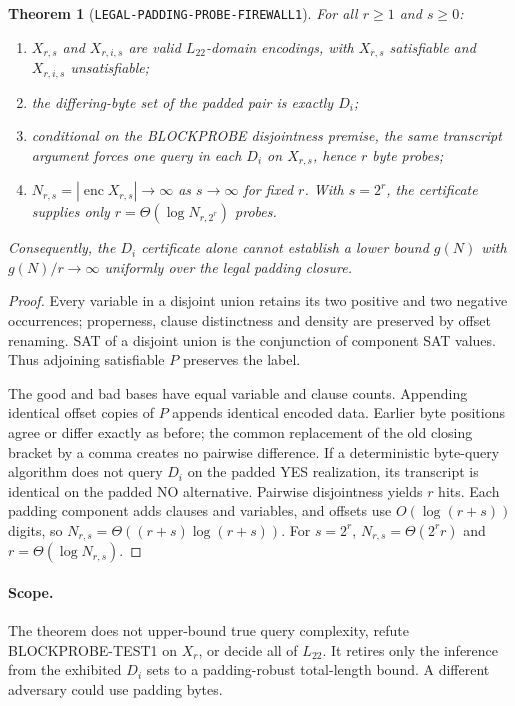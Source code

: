 \documentclass[11pt]{article}
\newtheorem{theorem}{Theorem}
\newcommand{\Ltwo}{L_{22}}
\begin{document}
\begin{theorem}[\texttt{LEGAL-PADDING-PROBE-FIREWALL1}]
For all $r\ge1$ and $s\ge0$:
\begin{enumerate}[label=(\roman*),leftmargin=*]
\item $X_{r,s}$ and $X_{r,i,s}$ are valid \(\Ltwo\)-domain encodings,
with $X_{r,s}$ satisfiable and $X_{r,i,s}$ unsatisfiable;
\item the differing-byte set of the padded pair is exactly $D_i$;
\item conditional on the BLOCKPROBE disjointness premise, the same transcript
argument forces one query in each $D_i$ on $X_{r,s}$, hence $r$ byte probes;
\item $N_{r,s}=|\operatorname{enc}X_{r,s}|\to\infty$ as $s\to\infty$
for fixed $r$. With $s=2^r$, the certificate supplies only
$r=\Theta(\log N_{r,2^r})$ probes.
\end{enumerate}
Consequently, the $D_i$ certificate alone cannot establish a lower bound
$g(N)$ with $g(N)/r\to\infty$ uniformly over the legal padding closure.
\end{theorem}

\begin{proof}
Every variable in a disjoint union retains its two positive and two negative
occurrences; properness, clause distinctness and density are preserved by
offset renaming. SAT of a disjoint union is the conjunction of component SAT
values. Thus adjoining satisfiable $P$ preserves the label.

The good and bad bases have equal variable and clause counts. Appending
identical offset copies of $P$ appends identical encoded data. Earlier byte
positions agree or differ exactly as before; the common replacement of the
old closing bracket by a comma creates no pairwise difference. If a
deterministic byte-query algorithm does not query $D_i$ on the padded YES
realization, its transcript is identical on the padded NO alternative.
Pairwise disjointness yields $r$ hits. Each padding component adds clauses and
variables, and offsets use $O(\log(r+s))$ digits, so
$N_{r,s}=\Theta((r+s)\log(r+s))$. For $s=2^r$,
$N_{r,s}=\Theta(2^r r)$ and $r=\Theta(\log N_{r,s})$.
\end{proof}

\paragraph{Scope.}
The theorem does not upper-bound true query complexity, refute
BLOCKPROBE-TEST1 on $X_r$, or decide all of \(\Ltwo\). It retires only the
inference from the exhibited $D_i$ sets to a padding-robust total-length
bound. A different adversary could use padding bytes.
\end{document}
